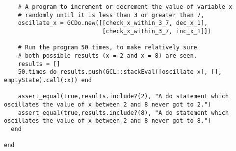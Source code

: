 \documentclass[11pt]{article}
\theoremstyle{definition}
\begin{document}
\begin{verbatim}
    # A program to increment or decrement the value of variable x
    # randomly until it is less than 3 or greater than 7,
    oscillate_x = GCDo.new([[check_x_within_3_7, dec_x_1],
                            [check_x_within_3_7, inc_x_1]])
    
    # Run the program 50 times, to make relatively sure
    # both possible results (x = 2 and x = 8) are seen.
    results = []
    50.times do results.push(GCL::stackEval([oscillate_x], [], emptyState).call(:x)) end

    assert_equal(true,results.include?(2), "A do statement which oscillates the value of x between 2 and 8 never got to 2.")
    assert_equal(true,results.include?(8), "A do statement which oscillates the value of x between 2 and 8 never got to 8.")
  end

end
\end{verbatim}
\end{document}
